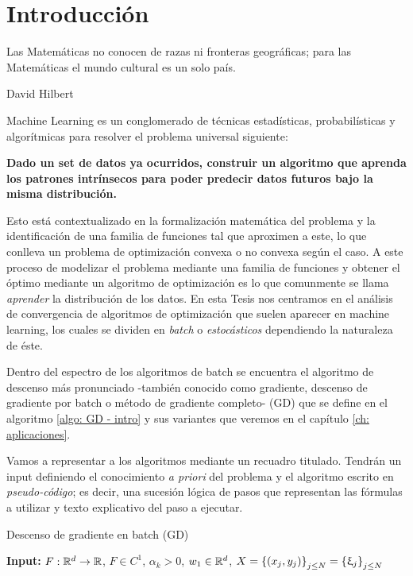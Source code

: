 \chapter{Introducci\'on}\label{ch:introduccion}

\epigraph{Las Matem\'aticas no conocen de razas ni fronteras geogr\'aficas; para las Matem\'aticas el mundo cultural es un solo pa\'is.}{David Hilbert}

Machine Learning es un conglomerado de t\'ecnicas estad\'isticas, probabil\'isticas y algor\'itmicas para resolver el problema universal siguiente:

\begin{center}
\textbf{Dado un set de datos ya ocurridos, construir un algoritmo que aprenda los patrones intr\'insecos para poder predecir datos futuros bajo la misma distribuci\'on.}
\end{center}

Esto est\'a contextualizado en la formalizaci\'on matem\'atica del problema y la identificaci\'on de una familia de funciones tal que aproximen a este, lo que conlleva un problema de optimizaci\'on convexa o no convexa seg\'un el caso. A este proceso de modelizar el problema mediante una familia de funciones y obtener el \'optimo mediante un algoritmo de optimizaci\'on es lo que comunmente se llama \textit{aprender} la distribuci\'on de los datos. En esta Tesis nos centramos en el an\'alisis de convergencia de algoritmos de optimizaci\'on que suelen aparecer en machine learning, los cuales se dividen en \textit{batch} o \textit{estoc\'asticos} dependiendo la naturaleza de \'este.

Dentro del espectro de los algoritmos de batch se encuentra el algoritmo de descenso m\'as pronunciado -tambi\'en conocido como gradiente, descenso de gradiente por batch o m\'etodo de gradiente completo- (GD) que se define en el algoritmo \ref{algo: GD - intro} y sus variantes que veremos en el cap\'itulo \ref{ch: aplicaciones}.

Vamos a representar a los algoritmos mediante un recuadro titulado. Tendr\'an un input definiendo el conocimiento \textit{a priori} del problema y el algoritmo escrito en \textit{pseudo-c\'odigo}; es decir, una sucesi\'on l\'ogica de pasos que representan las f\'ormulas a utilizar y texto explicativo del paso a ejecutar.

\LinesNumbered
\begin{algorithm}[H]
	\caption{Descenso de gradiente en batch (GD) \label{algo: GD - intro}}
	\textbf{Input:} $F: {\mathbb{R}}^d \rightarrow {\mathbb{R}}$, $F \in C^1$, $\alpha_k >0$, $w_1 \in {\mathbb{R}}^d$, $X = \left\lbrace(x_j,y_j)\right\rbrace_{j \leq N} = \left\lbrace\upxi_j\right\rbrace_{j \leq N}$  \\
\end{algorithm}

